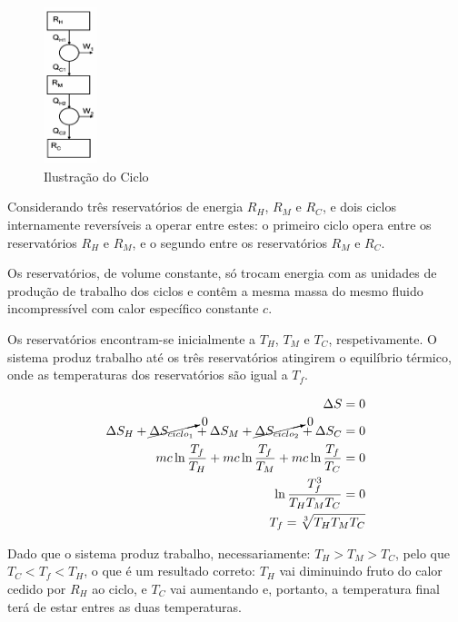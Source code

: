 \begin{examplebox}

\begin{figure}
  \centering
  \includegraphics[width=0.14\textwidth]{images/3R-exemploentropia.png}
  \caption{Ilustração do Ciclo}
\end{figure}

Considerando três reservatórios de energia $R_H$, $R_M$ e $R_C$, e dois ciclos internamente reversíveis a operar entre estes: o primeiro ciclo opera entre os reservatórios $R_H$ e $R_M$, e o segundo entre os reservatórios $R_M$ e $R_C$. 

Os reservatórios, de volume constante, só trocam energia com as unidades de produção de trabalho dos ciclos e contêm a mesma massa do mesmo fluido incompressível com calor específico constante $c$.

Os reservatórios encontram-se inicialmente a $T_H$, $T_M$ e $T_C$, respetivamente. O sistema produz trabalho até os três reservatórios atingirem o equilíbrio térmico, onde as temperaturas dos reservatórios são igual a $T_f$.

\begin{eqnarray*}
    \Delta S = 0 \\
    \Delta S_H + \cancelto{0}{\Delta S_{ciclo_1}} + \Delta S_M + \cancelto{0}{\Delta S_{ciclo_2}} + \Delta S_C = 0 \\
    m c \ln \frac{T_f}{T_H} + m c \ln \frac{T_f}{T_M} + m c \ln \frac{T_f}{T_C} = 0 \\
    \ln \frac{T_f^3}{T_H T_M T_C} = 0 \\
    T_f = \sqrt[3]{T_H T_M T_C}
\end{eqnarray*}

Dado que o sistema produz trabalho, necessariamente: $T_H > T_M > T_C$, pelo que $T_C < T_f < T_H$, o que é um resultado correto: $T_H$ vai diminuindo fruto do calor cedido por $R_H$ ao ciclo, e $T_C$ vai aumentando e, portanto, a temperatura final terá de estar entres as duas temperaturas. 


\end{examplebox}
